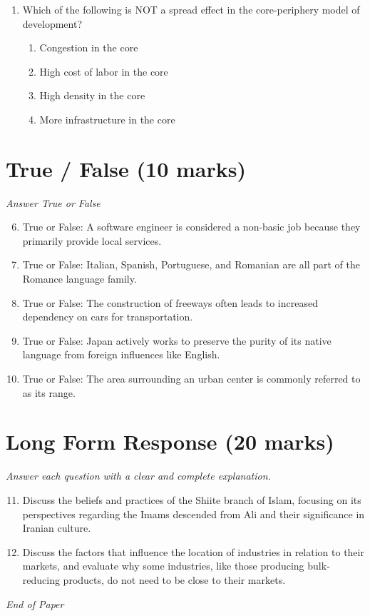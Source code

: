 \documentclass[12pt]{article}
\begin{document}
\begin{enumerate}[label=\arabic*.]
\begin{enumerate}[label=(\alph*)]
    \item Sub-Saharan Africa and Oceania
    \item Central Europe and Australia
\end{enumerate}
\item Which of the following is NOT a spread effect in the core-periphery model of development?
\begin{enumerate}[label=(\alph*)]
    \item Congestion in the core
    \item High cost of labor in the core
    \item High density in the core
    \item More infrastructure in the core
\end{enumerate}
\end{enumerate}

\section*{True / False (10 marks)}
\textit{Answer True or False}
\begin{enumerate}[label=\arabic*.]
\setcounter{enumi}{5}
\item True or False: A software engineer is considered a non-basic job because they primarily provide local services.
\item True or False: Italian, Spanish, Portuguese, and Romanian are all part of the Romance language family.
\item True or False: The construction of freeways often leads to increased dependency on cars for transportation.
\item True or False: Japan actively works to preserve the purity of its native language from foreign influences like English.
\item True or False: The area surrounding an urban center is commonly referred to as its range.
\end{enumerate}

\section*{Long Form Response (20 marks)}
\textit{Answer each question with a clear and complete explanation.}
\begin{enumerate}[label=\arabic*.]
\setcounter{enumi}{10}
\item Discuss the beliefs and practices of the Shiite branch of Islam, focusing on its perspectives regarding the Imams descended from Ali and their significance in Iranian culture.
\item Discuss the factors that influence the location of industries in relation to their markets, and evaluate why some industries, like those producing bulk-reducing products, do not need to be close to their markets.
\end{enumerate}

\vfill
\noindent\textit{End of Paper}
\end{document}
